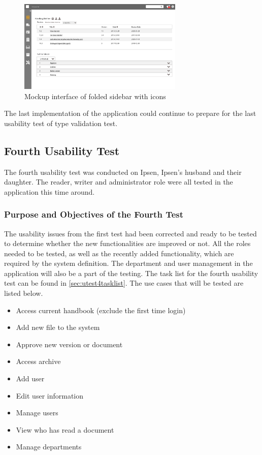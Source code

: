 \documentclass[../../master.tex]{subfiles}
\begin{document}
\begin{figure}[H]
	\centering
		\includegraphics[width=0.7\textwidth]{billeder/ForsideFoldedSidebar.jpg}
	\caption{Mockup interface of folded sidebar with icons}\label{fig:mockupSidebarIcon}
\end{figure}

The last implementation of the application could continue to prepare for the last usability test of type validation test.

\subsection{Fourth Usability Test}\label{fourthtest}
The fourth usability test was conducted on Ipsen, Ipsen's husband and their daughter.
The reader, writer and administrator role were all tested in the application this time around.

\subsubsection*{Purpose and Objectives of the Fourth Test}
The usability issues from the first test had been corrected and ready to be tested to determine whether the new functionalities are improved or not.
All the roles needed to be tested, as well as the recently added functionality, which are required by the system definition.
The department and user management in the application will also be a part of the testing.
The task list for the fourth usability test can be found in \cref{sec:utest4tasklist}.
The use cases that will be tested are listed below.

\begin{itemize}
	\item Access current handbook (exclude the first time login)
	\item Add new file to the system
	\item Approve new version or document
	\item Access archive
	\item Add user
	\item Edit user information
	\item Manage users
	\item View who has read a document
	\item Manage departments
\end{itemize}
\end{document}
